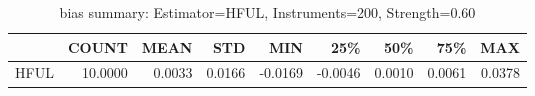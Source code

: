 \begin{table}[ht]
\centering
\caption{bias summary: Estimator=HFUL, Instruments=200, Strength=0.60}
\begin{tabular}{lrrrrrrrr}
\toprule
 & COUNT & MEAN & STD & MIN & 25\% & 50\% & 75\% & MAX \\
\midrule
HFUL & 10.0000 & 0.0033 & 0.0166 & -0.0169 & -0.0046 & 0.0010 & 0.0061 & 0.0378 \\
\bottomrule
\end{tabular}
\end{table}
